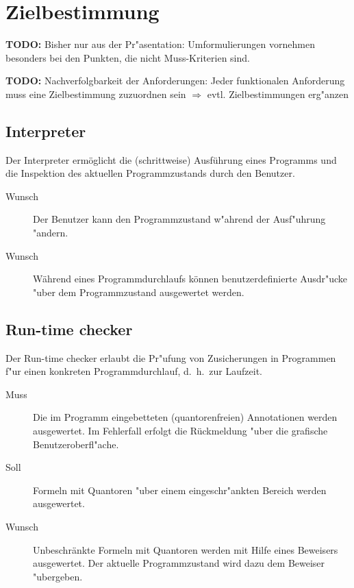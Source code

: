 \section{Zielbestimmung}%

\textbf{TODO:} Bisher nur aus der Pr"asentation: Umformulierungen vornehmen besonders bei den Punkten, die nicht Muss-Kriterien sind.%

\textbf{TODO:} Nachverfolgbarkeit der Anforderungen: Jeder funktionalen Anforderung muss eine Zielbestimmung zuzuordnen sein $\Rightarrow$ evtl. Zielbestimmungen erg"anzen%

\subsection{Interpreter}%

Der \see Interpreter ermöglicht die (schrittweise) Ausführung eines \see Programms und die Inspektion des aktuellen \see Programmzustands durch den Benutzer.%

\begin{description}%
    \item[Wunsch] Der Benutzer kann den Programmzustand w"ahrend der Ausf"uhrung "andern.%
    \item[Wunsch] Während eines Programmdurchlaufs können benutzerdefinierte \see Ausdr"ucke "uber dem Programmzustand ausgewertet werden.%
\end{description}%

\subsection{Run-time checker}%

Der \see Run-time checker erlaubt die Pr"ufung von \see Zusicherungen in Programmen f"ur einen konkreten Programmdurchlauf, d.~h.\ zur Laufzeit.%

\begin{description}%
    \item [Muss] Die im Programm eingebetteten (quantorenfreien) \see Annotationen werden ausgewertet. Im Fehlerfall erfolgt die Rückmeldung "uber die grafische Benutzeroberfl"ache.
    \item [Soll] Formeln mit \see Quantoren "uber einem eingeschr"ankten Bereich werden ausgewertet.%
    \item [Wunsch] Unbeschränkte Formeln mit Quantoren werden mit Hilfe eines \see Beweisers ausgewertet. Der aktuelle Programmzustand wird dazu dem Beweiser "ubergeben.
\end{description}%

